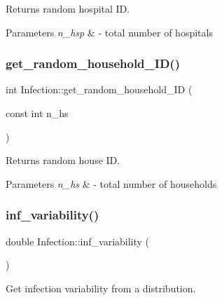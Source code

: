 Returns random hospital ID. 


\begin{DoxyParams}{Parameters}
{\em n\+\_\+hsp} & -\/ total number of hospitals \\
\hline
\end{DoxyParams}
\mbox{\label{classInfection_a4108bce6ea152f84adc3495188ce55a8}} 
\subsubsection{\texorpdfstring{get\+\_\+random\+\_\+household\+\_\+\+I\+D()}{get\_random\_household\_ID()}}
{\footnotesize\ttfamily int Infection\+::get\+\_\+random\+\_\+household\+\_\+\+ID (\begin{DoxyParamCaption}\item[{const int}]{n\+\_\+hs }\end{DoxyParamCaption})}



Returns random house ID. 


\begin{DoxyParams}{Parameters}
{\em n\+\_\+hs} & -\/ total number of households \\
\hline
\end{DoxyParams}
\mbox{\label{classInfection_a1fb9e4d8f90f0bece0b65f2cb2f9ef7e}} 
\subsubsection{\texorpdfstring{inf\+\_\+variability()}{inf\_variability()}}
{\footnotesize\ttfamily double Infection\+::inf\+\_\+variability (\begin{DoxyParamCaption}{ }\end{DoxyParamCaption})}



Get infection variability from a distribution. 

\mbox{\label{classInfection_a1fac8f0633f707e14fb10250f8ba6863}} 
